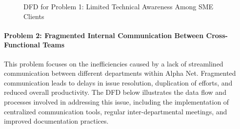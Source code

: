 \begin{figure}[H]
{%
    }
    \caption{DFD for Problem 1: Limited Technical Awareness Among SME Clients}
    \label{fig:problem1_dfd}
\end{figure}

\clearpage

\paragraph{Problem 2: Fragmented Internal Communication Between Cross-Functional Teams}
This problem focuses on the inefficiencies caused by a lack of streamlined communication between different departments within Alpha Net. Fragmented communication leads to delays in issue resolution, duplication of efforts, and reduced overall productivity. The DFD below illustrates the data flow and processes involved in addressing this issue, including the implementation of centralized communication tools, regular inter-departmental meetings, and improved documentation practices.

